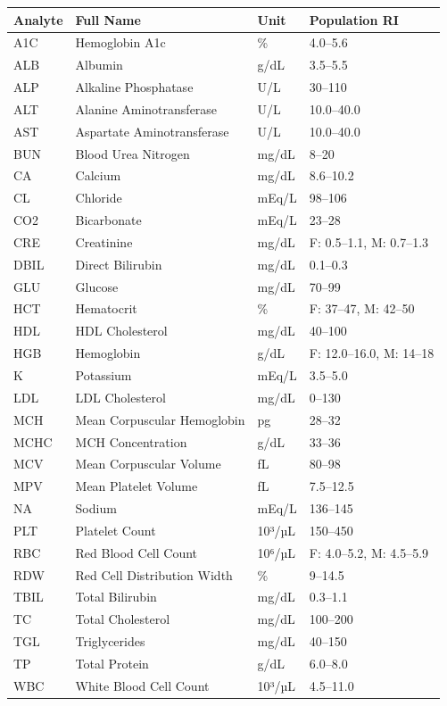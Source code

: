 \begin{table}[ht]
\centering
\footnotesize
\begin{tabular}{llll}
\toprule
Analyte & Full Name & Unit & Population RI \\
\midrule
A1C & Hemoglobin A1c & \% & 4.0--5.6 \\
ALB & Albumin & g/dL & 3.5--5.5 \\
ALP & Alkaline Phosphatase & U/L & 30--110 \\
ALT & Alanine Aminotransferase & U/L & 10.0--40.0 \\
AST & Aspartate Aminotransferase & U/L & 10.0--40.0 \\
BUN & Blood Urea Nitrogen & mg/dL & 8--20 \\
CA & Calcium & mg/dL & 8.6--10.2 \\
CL & Chloride & mEq/L & 98--106 \\
CO2 & Bicarbonate & mEq/L & 23--28 \\
CRE & Creatinine & mg/dL & F: 0.5--1.1, M: 0.7--1.3 \\
DBIL & Direct Bilirubin & mg/dL & 0.1--0.3 \\
GLU & Glucose & mg/dL & 70--99 \\
HCT & Hematocrit & \% & F: 37--47, M: 42--50 \\
HDL & HDL Cholesterol & mg/dL & 40--100 \\
HGB & Hemoglobin & g/dL & F: 12.0--16.0, M: 14--18 \\
K & Potassium & mEq/L & 3.5--5.0 \\
LDL & LDL Cholesterol & mg/dL & 0--130 \\
MCH & Mean Corpuscular Hemoglobin & pg & 28--32 \\
MCHC & MCH Concentration & g/dL & 33--36 \\
MCV & Mean Corpuscular Volume & fL & 80--98 \\
MPV & Mean Platelet Volume & fL & 7.5--12.5 \\
NA & Sodium & mEq/L & 136--145 \\
PLT & Platelet Count & 10³/µL & 150--450 \\
RBC & Red Blood Cell Count & 10⁶/µL & F: 4.0--5.2, M: 4.5--5.9 \\
RDW & Red Cell Distribution Width & \% & 9--14.5 \\
TBIL & Total Bilirubin & mg/dL & 0.3--1.1 \\
TC & Total Cholesterol & mg/dL & 100--200 \\
TGL & Triglycerides & mg/dL & 40--150 \\
TP & Total Protein & g/dL & 6.0--8.0 \\
WBC & White Blood Cell Count & 10³/µL & 4.5--11.0 \\
\bottomrule
\end{tabular}
\label{tab:analyte_reference}
\end{table}
